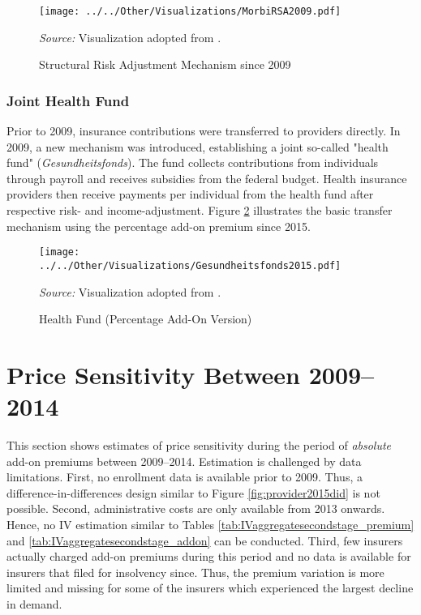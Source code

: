 \documentclass[a4paper, 11pt, english]{article}
\begin{document}
\begin{figure}[htbp]
	\centering
	\caption{Structural Risk Adjustment Mechanism since 2009}
	\label{fig:MorbiRSA}
	\texttt{[image: ../../Other/Visualizations/MorbiRSA2009.pdf]}
	\begin{minipage}{0.8\textwidth}
		\footnotesize \centering
		\textit{Source:} Visualization adopted from \citet{kohlhammer2017}.
	\end{minipage}
\end{figure}

\subsubsection*{Joint Health Fund}

Prior to 2009, insurance contributions were transferred to providers directly. In 2009, a new mechanism was introduced, establishing a joint so-called "health fund" (\textit{Gesundheitsfonds}). The fund collects contributions from individuals through payroll and receives subsidies from the federal budget. Health insurance providers then receive payments per individual from the health fund after respective risk- and income-adjustment. Figure \ref{fig:health_fund2015} illustrates the basic transfer mechanism using the percentage add-on premium since 2015. 

\begin{figure}[H]
	\centering
	\caption{Health Fund (Percentage Add-On Version)}
	\label{fig:health_fund2015}		
	\texttt{[image: ../../Other/Visualizations/Gesundheitsfonds2015.pdf]}
	\begin{minipage}{0.8\textwidth}
		\footnotesize \centering
		\textit{Source:} Visualization adopted from \citet{kohlhammer2017}.
	\end{minipage} 
\end{figure}


\clearpage 
\newpage
\section{Price Sensitivity Between 2009--2014 \label{app:analysis2009}} 
\setcounter{figure}{0}
\setcounter{table}{0}

This section shows estimates of price sensitivity during the period of \textit{absolute} add-on premiums between 2009--2014. Estimation is challenged by data limitations. First, no enrollment data is available prior to 2009. Thus, a difference-in-differences design similar to Figure \ref{fig:provider2015did} is not possible. Second, administrative costs are only available from 2013 onwards. Hence, no IV estimation similar to Tables \ref{tab:IVaggregatesecondstage_premium} and \ref{tab:IVaggregatesecondstage_addon} can be conducted. Third, few insurers actually charged add-on premiums during this period and no data is available for insurers that filed for insolvency since. Thus, the premium variation is more limited and missing for some of the insurers which experienced the largest decline in demand. 
\end{document}
